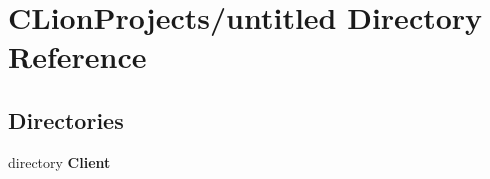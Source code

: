 \section{C\+Lion\+Projects/untitled Directory Reference}
\label{dir_bf01346f52fb04ff7f6f24d83732c6ad}
\subsection*{Directories}
\begin{DoxyCompactItemize}
\item 
directory \textbf{ Client}
\end{DoxyCompactItemize}
